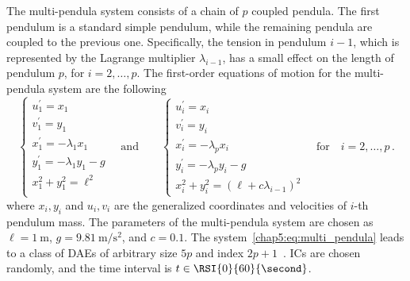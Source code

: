 The multi-pendula system consists of a chain of $p$ coupled pendula. The first pendulum is a standard simple pendulum, while the remaining pendula are coupled to the previous one. Specifically, the tension in pendulum $i - 1$, which is represented by the Lagrange multiplier $\lambda_{i-1}$, has a small effect on the length of
pendulum $p$, for $i = 2, \dots, p$. The first-order equations of motion for the multi-pendula system are the following~\cite{nedialkov2008solvingIII}
%
\begin{equation}
  \begin{cases}
    u_1^{\prime} = x_1 \\
    v_1^{\prime} = y_1 \\
    x_1^{\prime} = -\lambda_1 x_1 \\
    y_1^{\prime} = -\lambda_1 y_1 - g \\
    x_1^2 + y_1^2 = \ell^2 \\
  \end{cases}
  \quad \text{and} \qquad
  \begin{cases}
    u_i^{\prime} = x_i \\
    v_i^{\prime} = y_i \\
    x_i^{\prime} = -\lambda_p x_i \\
    y_i^{\prime} = -\lambda_p y_i - g \\
    x_i^2 + y_i^2 = (\ell + c\lambda_{i-1})^2
  \end{cases}
  \quad \text{for} \quad i = 2, \dots, p \, \text{.}
  \label{chap5:eq:multi_pendula}
\end{equation}
%
where $x_i, y_i$ and $u_i, v_i$ are the generalized coordinates and velocities of $i$-th pendulum mass. The parameters of the multi-pendula system are chosen as $\ell = \SI{1}{\meter}$, $g = \SI{9.81}{\meter\per\second\squared}$, and $c = 0.1$. The system~\eqref{chap5:eq:multi_pendula} leads to a class of \acp{DAE} of arbitrary size $5p$ and index $2p+1$~\cite{nedialkov2008solvingIII}. \acp{IC} are chosen randomly, and the time interval is $t \in \RSI{0}{60}{\second}$.

